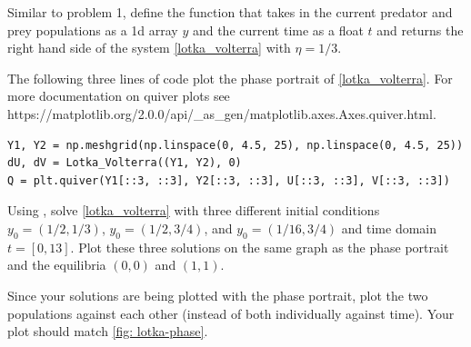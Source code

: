 

\begin{problem}
Similar to problem 1, define the function  that takes in the current predator and prey populations as a 1d array $y$ and the current time as a float $t$ and returns the right hand side of the system \eqref{lotka_volterra} with $\eta=1/3$.

The following three lines of code plot the phase portrait of \eqref{lotka_volterra}. 
For more documentation on quiver plots see https://matplotlib.org/2.0.0/api/\_as\_gen/matplotlib.axes.Axes.quiver.html.
\begin{lstlisting}
Y1, Y2 = np.meshgrid(np.linspace(0, 4.5, 25), np.linspace(0, 4.5, 25))
dU, dV = Lotka_Volterra((Y1, Y2), 0)
Q = plt.quiver(Y1[::3, ::3], Y2[::3, ::3], U[::3, ::3], V[::3, ::3])
\end{lstlisting}
Using , solve \eqref{lotka_volterra} with three different initial conditions $y_0 = (1/2, 1/3)$, $y_0=(1/2, 3/4)$, and $y_0=(1/16, 3/4)$ and time domain $t = [0,13]$. Plot these three solutions on the same graph as the phase portrait and the equilibria $(0,0)$ and $(1,1)$.

Since your solutions are being plotted with the phase portrait, plot the two populations against each other (instead of both individually against time). Your plot should match \ref{fig: lotka-phase}.
\end{problem}
